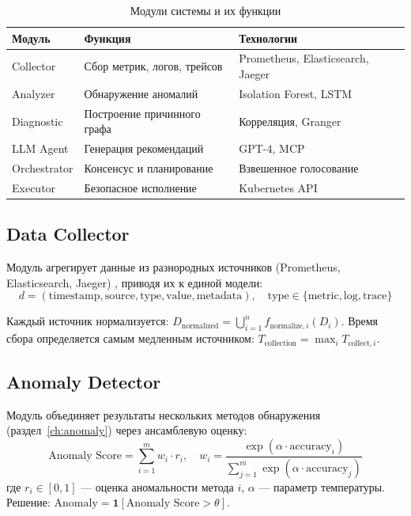 \begin{table}[H]
\centering
\small

\caption{Модули системы и их функции}
\label{tab:system_modules}
\begin{tabular}{|>{\raggedright\arraybackslash}p{2.5cm}|>{\raggedright\arraybackslash}p{4cm}|>{\raggedright\arraybackslash}p{4cm}|}
\hline
Модуль & Функция & Технологии \\
\hline
Collector & Сбор метрик, логов, трейсов & Prometheus, Elasticsearch, Jaeger \\
\hline
Analyzer & Обнаружение аномалий & Isolation Forest, LSTM \\
\hline
Diagnostic & Построение причинного графа & Корреляция, Granger \\
\hline
LLM Agent & Генерация рекомендаций & GPT-4, MCP \\
\hline
Orchestrator & Консенсус и планирование & Взвешенное голосование \\
\hline
Executor & Безопасное исполнение & Kubernetes API \\
\hline
\end{tabular}
\end{table}

\subsection{Data Collector}

Модуль агрегирует данные из разнородных источников (Prometheus, Elasticsearch, Jaeger) \cite{prometheus_docs,elasticsearch_docs,jaeger_docs,opentelemetry}, приводя их к единой модели:
\begin{equation}
d = (\text{timestamp}, \text{source}, \text{type}, \text{value}, \text{metadata}), \quad \text{type} \in \{\text{metric}, \text{log}, \text{trace}\}
\label{eq:unified_data_model}
\end{equation}

Каждый источник нормализуется: $D_{\text{normalized}} = \bigcup_{i=1}^{n} f_{\text{normalize},i}(D_i)$. \linebreak Время сбора определяется самым медленным источником: $T_{\text{collection}} = \max_{i} T_{\text{collect},i}$.

\subsection{Anomaly Detector}

Модуль объединяет результаты нескольких методов обнаружения (раздел~\ref{ch:anomaly}) через ансамблевую оценку:
\begin{equation}
\text{Anomaly Score} = \sum_{i=1}^{m} w_i \cdot r_i, \quad w_i = \frac{\exp(\alpha \cdot \text{accuracy}_i)}{\sum_{j=1}^{m} \exp(\alpha \cdot \text{accuracy}_j)}
\label{eq:ensemble_anomaly}
\end{equation}
где $r_i \in [0, 1]$ --- оценка аномальности метода $i$, $\alpha$ --- параметр температуры. Решение: $\text{Anomaly} = \mathbf{1}[\text{Anomaly Score} > \theta]$.

